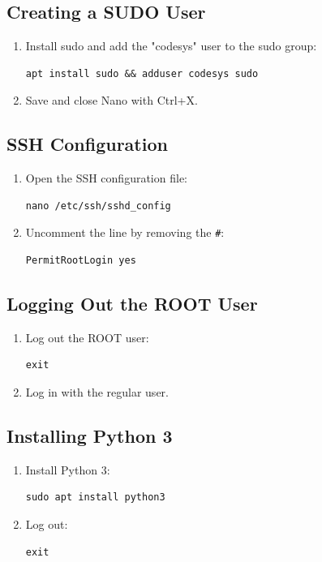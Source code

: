 \documentclass[a4paper,12pt]{article}
\begin{document}
\subsection{Creating a SUDO User}
\begin{enumerate}
\item Install sudo and add the "codesys" user to the sudo group:
\begin{lstlisting}
apt install sudo && adduser codesys sudo
\end{lstlisting}
\item Save and close Nano with Ctrl+X.
\end{enumerate}

\subsection{SSH Configuration}
\begin{enumerate}
\item Open the SSH configuration file:
\begin{lstlisting}
nano /etc/ssh/sshd_config
\end{lstlisting}
\item Uncomment the line by removing the \texttt{\#}:
\begin{lstlisting}
PermitRootLogin yes
\end{lstlisting}
\end{enumerate}

\subsection{Logging Out the ROOT User}
\begin{enumerate}
\item Log out the ROOT user:
\begin{lstlisting}
exit
\end{lstlisting}
\item Log in with the regular user.
\end{enumerate}

\subsection{Installing Python 3}
\begin{enumerate}
\item Install Python 3:
\begin{lstlisting}
sudo apt install python3
\end{lstlisting}
\item Log out:
\begin{lstlisting}
exit
\end{lstlisting}
\end{enumerate}
\end{document}
